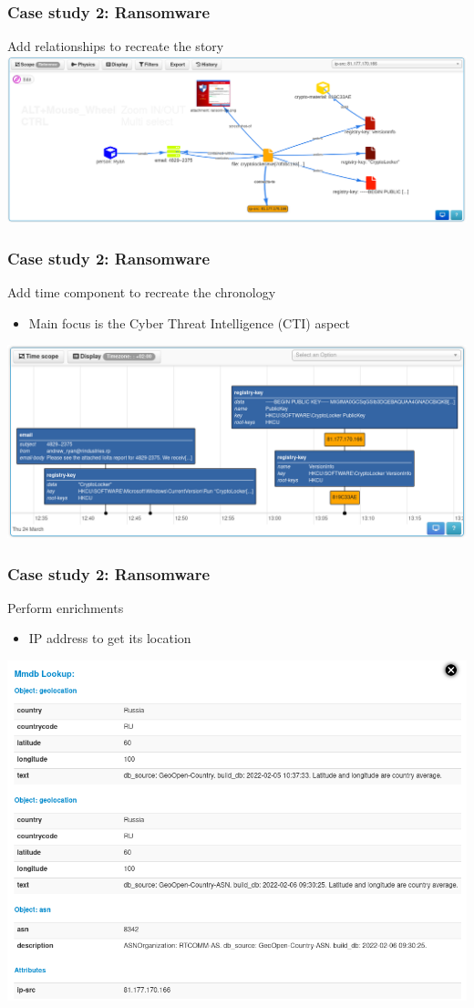 \begin{frame}
    \frametitle{Case study 2: Ransomware}
    Add relationships to recreate the story
    \includegraphics[width=1.0\linewidth]{pictures/case2/event-graph.png}
\end{frame}

\begin{frame}
    \frametitle{Case study 2: Ransomware}
    Add time component to recreate the chronology
    \begin{itemize}
        \item Main focus is the Cyber Threat Intelligence (CTI) aspect
    \end{itemize}
    \includegraphics[width=1.0\linewidth]{pictures/case2/timeline.png}
\end{frame}

\begin{frame}
    \frametitle{Case study 2: Ransomware}
    Perform enrichments
    \begin{itemize}
        \item IP address to get its location
    \end{itemize}
    \includegraphics[width=1.0\linewidth]{pictures/case2/enrichment1.png}
\end{frame}


